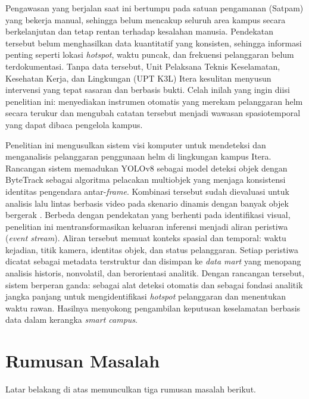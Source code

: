 Pengawasan yang berjalan saat ini bertumpu pada satuan pengamanan (Satpam) yang bekerja manual, sehingga belum mencakup seluruh area kampus secara berkelanjutan dan tetap rentan terhadap kesalahan manusia. Pendekatan tersebut belum menghasilkan data kuantitatif yang konsisten, sehingga informasi penting seperti lokasi \textit{hotspot}, waktu puncak, dan frekuensi pelanggaran belum terdokumentasi. Tanpa data tersebut, Unit Pelaksana Teknis Keselamatan, Kesehatan Kerja, dan Lingkungan (UPT K3L) Itera kesulitan menyusun intervensi yang tepat sasaran dan berbasis bukti. Celah inilah yang ingin diisi penelitian ini: menyediakan instrumen otomatis yang merekam pelanggaran helm secara terukur dan mengubah catatan tersebut menjadi wawasan spasiotemporal yang dapat dibaca pengelola kampus.

Penelitian ini mengusulkan sistem visi komputer untuk mendeteksi dan menganalisis pelanggaran penggunaan helm di lingkungan kampus Itera. Rancangan sistem memadukan YOLOv8 sebagai model deteksi objek dengan ByteTrack sebagai algoritma pelacakan multiobjek yang menjaga konsistensi identitas pengendara antar-\textit{frame}. Kombinasi tersebut sudah dievaluasi untuk analisis lalu lintas berbasis video pada skenario dinamis dengan banyak objek bergerak \cite{liu2025vehicle}. Berbeda dengan pendekatan yang berhenti pada identifikasi visual, penelitian ini mentransformasikan keluaran inferensi menjadi aliran peristiwa (\textit{event stream}). Aliran tersebut memuat konteks spasial dan temporal: waktu kejadian, titik kamera, identitas objek, dan status pelanggaran. Setiap peristiwa dicatat sebagai metadata terstruktur dan disimpan ke \textit{data mart} yang menopang analisis historis, nonvolatil, dan berorientasi analitik. Dengan rancangan tersebut, sistem berperan ganda: sebagai alat deteksi otomatis dan sebagai fondasi analitik jangka panjang untuk mengidentifikasi \textit{hotspot} pelanggaran dan menentukan waktu rawan. Hasilnya menyokong pengambilan keputusan keselamatan berbasis data dalam kerangka \textit{smart campus}.

\section{Rumusan Masalah}
\label{section:rumusanmasalah}

Latar belakang di atas memunculkan tiga rumusan masalah berikut.


